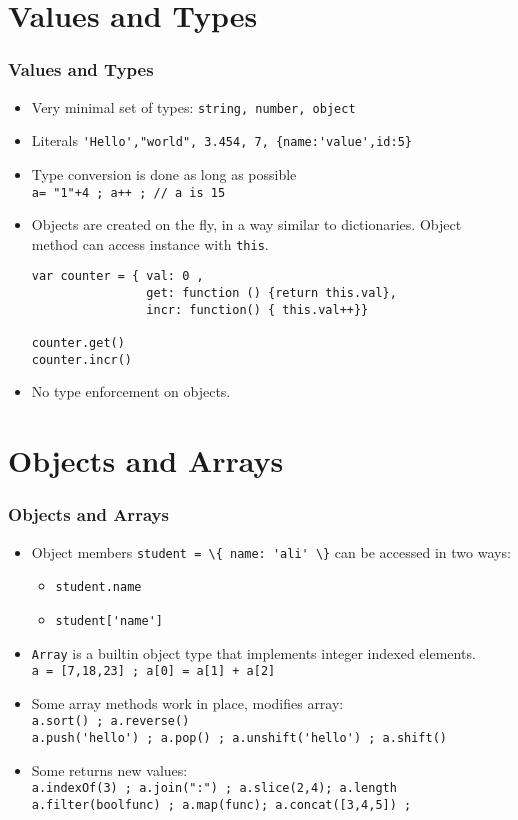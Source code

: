 \documentclass[trans,compress,xcolor=table]{beamer}
\begin{document}
\section{Values and Types}
\begin{frame}[fragile]
\frametitle{Values and Types}
\begin{itemize}
\item Very minimal set of types: \lstinline!string, number, object!
\item Literals \lstinline!'Hello',"world", 3.454, 7, {name:'value',id:5}!
\item Type conversion is done as long as possible\\
\lstinline!a= "1"+4 ; a++ ; // a is 15!
\item Objects are created on the fly, in a way similar 
	to  
	dictionaries. Object method can access instance with \lstinline!this!.
\begin{lstlisting}
var counter = { val: 0 , 
                get: function () {return this.val},
                incr: function() { this.val++}}

counter.get()
counter.incr()
\end{lstlisting}
\item No type enforcement on objects. 
\end{itemize}
\end{frame}

\section{Objects and Arrays}
\begin{frame}
\frametitle{Objects and Arrays}
\begin{itemize}
\item Object members \lstinline!student = \{ name: 'ali' \}! can be accessed in two ways:
\begin{itemize}
	\item \lstinline!student.name!
	\item \lstinline[]!student['name']!
\end{itemize}
\item \lstinline!Array! is a builtin object type that implements
	integer indexed elements.\\
	\lstinline[]!a = [7,18,23] ; a[0] = a[1] + a[2]!
\item Some array methods work in place, modifies array:\\
	\lstinline!a.sort() ; a.reverse()! \\
	\lstinline!a.push('hello') ; a.pop() ; a.unshift('hello') ; a.shift()!\\
\item Some returns new values:\\
	\lstinline!a.indexOf(3) ; a.join(":") ; a.slice(2,4); a.length!  \\
	\lstinline!a.filter(boolfunc) ; a.map(func); a.concat([3,4,5]) ; !\\
\end{itemize}
\end{frame}
\end{document}
